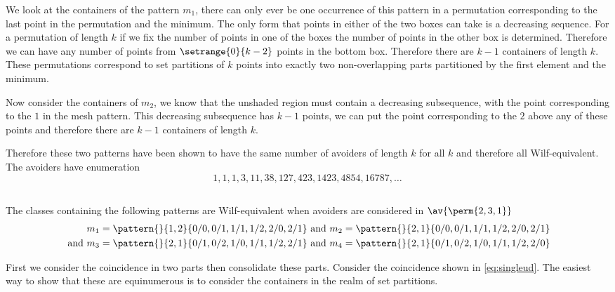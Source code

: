 We look at the containers of the pattern \(m_1\), there can only ever
be one occurrence of this pattern in a permutation corresponding to
the last point in the permutation and the minimum. The only form that
points in either of the two boxes can take is a decreasing sequence.
For a permutation of length \(k\) if we fix the number of points in
one of the boxes the number of points in the other box is determined.
Therefore we can have any number of points from \(\setrange{0}{k-2}\)
points in the bottom box. Therefore there are \(k-1\) containers of
length \(k\). These permutations correspond to set partitions of \(k\)
points into exactly two non-overlapping parts partitioned by the first
element and the minimum.

Now consider the containers of \(m_2\), we know that the unshaded region
must contain a decreasing subsequence, with the point corresponding to
the \(1\) in the mesh pattern. This decreasing subsequence has \(k-1\)
points, we can put the point corresponding to the \(2\) above any of these
points and therefore there are \(k-1\) containers of length \(k\).

Therefore these two patterns have been shown to have the same number of
avoiders of length \(k\) for all \(k\) and therefore all Wilf-equivalent.
The avoiders have enumeration
\begin{equation*}
    1, 1, 1, 3, 11, 38, 127, 423, 1423, 4854, 16787,\dotsc
\end{equation*}

\subsection{}
The classes containing the following patterns are Wilf-equivalent
when avoiders are considered in \(\av{\perm{2,3,1}}\)
\begin{align}
    m_1 = \pattern{}{1,2}{0/0,0/1,1/1,1/2,2/0,2/1} &\text{ and }
    m_2 = \pattern{}{2,1}{0/0,0/1,1/1,1/2,2/0,2/1} \label{eq:singleud}\\
    \text{ and }
    m_3 = \pattern{}{2,1}{0/1,0/2,1/0,1/1,1/2,2/1} &\text{ and }
    m_4 = \pattern{}{2,1}{0/1,0/2,1/0,1/1,1/2,2/0} \label{eq:other}
\end{align}

First we consider the coincidence in two parts then consolidate these parts.
Consider the coincidence shown in \eqref{eq:singleud}. The easiest way to
show that these are equinumerous is to consider the containers in the realm
of set partitions.

